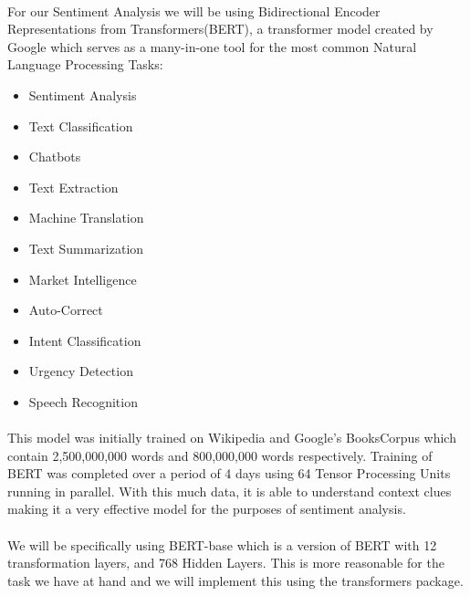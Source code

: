 \documentclass[12pt, letterpaper, titlepage]{article}
\begin{document}
\paragraph{}
For our Sentiment Analysis we will be using Bidirectional Encoder Representations from Transformers(BERT), a transformer model created by Google which serves as a many-in-one tool for the most common Natural Language Processing Tasks:
\begin{itemize}
    \item Sentiment Analysis
    \item Text Classification
    \item Chatbots
    \item Text Extraction
    \item Machine Translation
    \item Text Summarization
    \item Market Intelligence
    \item Auto-Correct
    \item Intent Classification
    \item Urgency Detection
    \item Speech Recognition
\end{itemize}

\paragraph{}
This model was initially trained on Wikipedia and Google’s BooksCorpus which contain 2,500,000,000 words and 800,000,000 words respectively. Training of BERT was completed over a period of 4 days using 64 Tensor Processing Units running in parallel. With this much data, it is able to understand context clues making it a very effective model for the purposes of sentiment analysis.

\paragraph{}
We will be specifically using BERT-base which is a version of BERT with 12 transformation layers, and 768 Hidden Layers.\citep{muller_2022} This is more reasonable for the task we have at hand and we will implement this using the transformers package.
\end{document}
